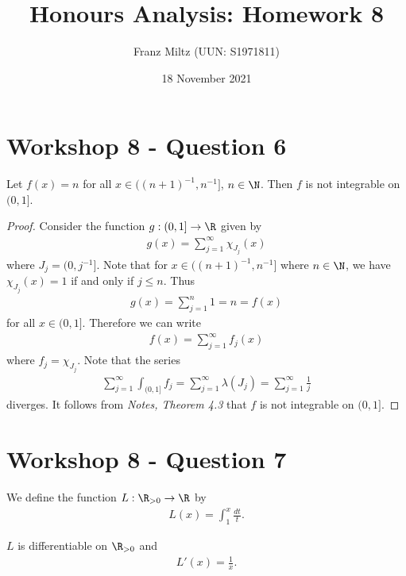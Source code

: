 \documentclass{article}
\begin{document}
\title{Honours Analysis: Homework 8}
\author{Franz Miltz (UUN: S1971811)}
\date{18 November 2021}
\maketitle

\section*{Workshop 8 - Question 6}

\begin{claim*}
   Let $f(x)=n$ for all $x\in((n+1)^{-1}, n^{-1}]$, $n\in\N$. Then $f$ is not integrable on
   $(0,1]$.
\end{claim*}
\begin{proof}
   Consider the function $g:(0,1]\to\R$ given by
   \begin{align*}
      g(x) = \sum_{j=1}^\infty \chi_{J_j}(x)
   \end{align*}
   where $J_j = (0, j^{-1}]$. Note that for $x\in((n+1)^{-1}, n^{-1}]$ where $n\in\N$,
   we have $\chi_{J_j}(x)=1$ if and only if $j\leq n$. Thus
   \begin{align*}
      g(x) = \sum_{j=1}^n 1 = n = f(x)
   \end{align*}
   for all $x\in(0,1]$. Therefore we can write
   \begin{align*}
      f(x) = \sum_{j=1}^\infty f_j(x)
   \end{align*}
   where $f_j=\chi_{J_j}$. Note that the series
   \begin{align*}
      \sum_{j=1}^\infty \int_{(0,1]} f_j = \sum_{j=1}^\infty \lambda(J_j)
      = \sum_{j=1}^\infty \frac{1}{j}
   \end{align*}
   diverges. It follows from \emph{Notes, Theorem 4.3} that $f$ is not integrable on $(0,1]$.
\end{proof}

\section*{Workshop 8 - Question 7}

We define the function $L:\R_{>0}\to\R$ by
\begin{align*}
   L(x) = \int_1^x \frac{dt}{t}.
\end{align*}

\begin{claim*}
   $L$ is differentiable on $\R_{>0}$ and
   \begin{align}
      \label{deriv}
      L'(x) = \frac{1}{x}.
   \end{align}
\end{claim*}
\end{document}
